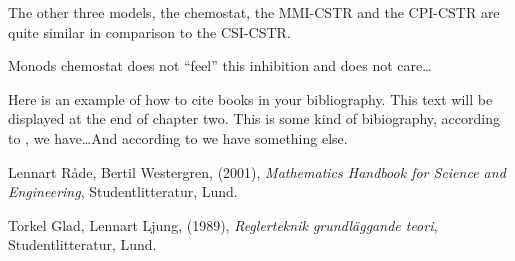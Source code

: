 \documentclass[a4paper, 10pt, twoside, openright]{book}
\begin{document}


The other three models, the chemostat, the MMI-CSTR and the CPI-CSTR
are quite similar in comparison to the CSI-CSTR. 

Monods chemostat does not ``feel'' this inhibition and does not care\ldots 







%
Here is an example of how to cite books in your bibliography. This
text will be displayed at the end of chapter two. This is some kind of
bibiography, according to \cite{beta}, we have\ldots And according to
\cite{beta,Glad} we have something else.

\begin{thebibliography}{99}



Lennart Råde, Bertil Westergren, 
(2001), 
\emph{Mathematics Handbook for Science and Engineering},
Studentlitteratur, 
Lund.

Torkel Glad, Lennart Ljung,
(1989), 
\emph{Reglerteknik grundläggande teori},
Studentlitteratur, 
Lund.

\end{thebibliography}
\end{document}
